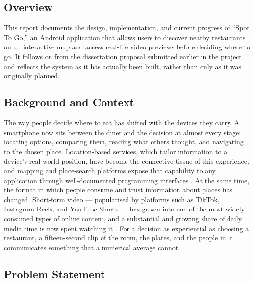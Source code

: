 \documentclass[12pt, a4paper]{article}
\begin{document}
\subsection{Overview}

This report documents the design, implementation, and current progress of ``Spot To Go,'' an Android application that allows users to discover nearby restaurants on an interactive map and access real-life video previews before deciding where to go. It follows on from the dissertation proposal submitted earlier in the project and reflects the system as it has actually been built, rather than only as it was originally planned.

\subsection{Background and Context}

The way people decide where to eat has shifted with the devices they carry. A smartphone now sits between the diner and the decision at almost every stage: locating options, comparing them, reading what others thought, and navigating to the chosen place. Location-based services, which tailor information to a device's real-world position, have become the connective tissue of this experience, and mapping and place-search platforms expose that capability to any application through well-documented programming interfaces \citep{google_places, android_location}. At the same time, the format in which people consume and trust information about places has changed. Short-form video --- popularised by platforms such as TikTok, Instagram Reels, and YouTube Shorts --- has grown into one of the most widely consumed types of online content, and a substantial and growing share of daily media time is now spent watching it \citep{datareportal2024, montag2021}. For a decision as experiential as choosing a restaurant, a fifteen-second clip of the room, the plates, and the people in it communicates something that a numerical average cannot.

\subsection{Problem Statement}
\end{document}
